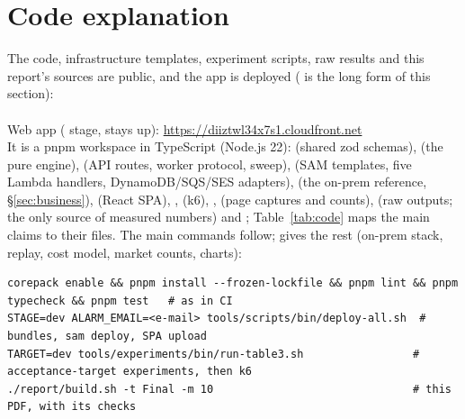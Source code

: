 \section{Code explanation}\label{sec:code}
The code, infrastructure templates, experiment scripts, raw results and this report's sources are
public, and the app is deployed ( is the long form of this section):\\
\\
\hspace*{1.2em}Web app ( stage, stays up): {\url{https://diiztwl34x7s1.cloudfront.net}}\\
It is a pnpm workspace in TypeScript (Node.js 22):  (shared zod schemas),  (the pure
engine),  (API routes, worker protocol, sweep),  (SAM
templates, five Lambda handlers, DynamoDB/SQS/SES adapters),  (the on-prem
reference, \S\ref{sec:business}),  (React SPA),
,  (k6), , 
(page captures and counts),  (raw outputs; the only source of measured numbers) and
; Table~\ref{tab:code} maps the main claims to their files. The main commands follow;
 gives the rest (on-prem stack, replay, cost model, market counts, charts):

\noindent\begin{minipage}{\textwidth}\footnotesize
\begin{verbatim}
corepack enable && pnpm install --frozen-lockfile && pnpm lint && pnpm typecheck && pnpm test   # as in CI
STAGE=dev ALARM_EMAIL=<e-mail> tools/scripts/bin/deploy-all.sh  # bundles, sam deploy, SPA upload
TARGET=dev tools/experiments/bin/run-table3.sh                 # acceptance-target experiments, then k6
./report/build.sh -t Final -m 10                               # this PDF, with its checks
\end{verbatim}
\end{minipage}


